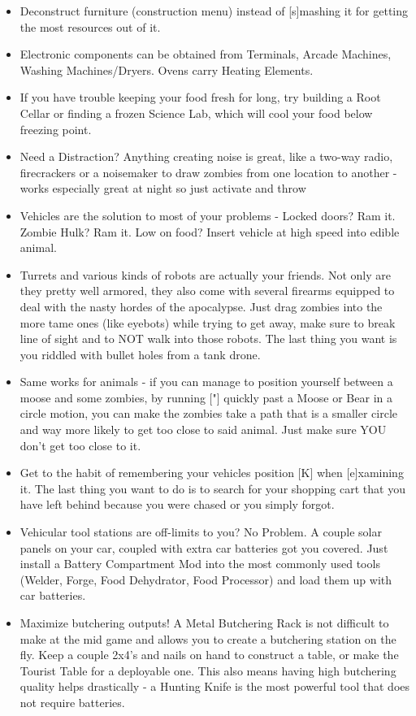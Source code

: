 \begin{itemize}
\item Deconstruct furniture (construction menu) instead of [s]mashing it for getting the most resources out of it.
\item Electronic components can be obtained from Terminals, Arcade Machines, Washing Machines/Dryers. Ovens carry Heating Elements.
\item If you have trouble keeping your food fresh for long, try building a Root Cellar or finding a frozen Science Lab, which will cool your food below freezing point.
\item Need a Distraction? Anything creating noise is great, like a two-way radio, firecrackers or a noisemaker to draw zombies from one location to another - works especially great at night so just activate and throw
\item Vehicles are the solution to most of your problems - Locked doors? Ram it. Zombie Hulk? Ram it. Low on food? Insert vehicle at high speed into edible animal.
\item Turrets and various kinds of robots are actually your friends. Not only are they pretty well armored, they also come with several firearms equipped to deal with the nasty hordes of the apocalypse. Just drag zombies into the more tame ones (like eyebots) while trying to get away, make sure to break line of sight and to NOT walk into those robots. The last thing you want is you riddled with bullet holes from a tank drone.
\item Same works for animals - if you can manage to position yourself between a moose and some zombies, by running ["] quickly past a Moose or Bear in a circle motion, you can make the zombies take a path that is a smaller circle and way more likely to get too close to said animal. Just make sure YOU don't get too close to it.
\item Get to the habit of remembering your vehicles position [K] when [e]xamining it. The last thing you want to do is to search for your shopping cart that you have left behind because you were chased or you simply forgot.
\item Vehicular tool stations are off-limits to you? No Problem. A couple solar panels on your car, coupled with extra car batteries got you covered. Just install a Battery Compartment Mod into the most commonly used tools (Welder, Forge, Food Dehydrator, Food Processor) and load them up with car batteries.
\item Maximize butchering outputs! A Metal Butchering Rack is not difficult to make at the mid game and allows you to create a butchering station on the fly. Keep a couple 2x4's and nails on hand to construct a table, or make the Tourist Table for a deployable one. This also means having high butchering quality helps drastically - a Hunting Knife is the most powerful tool that does not require batteries.

\end{itemize}
